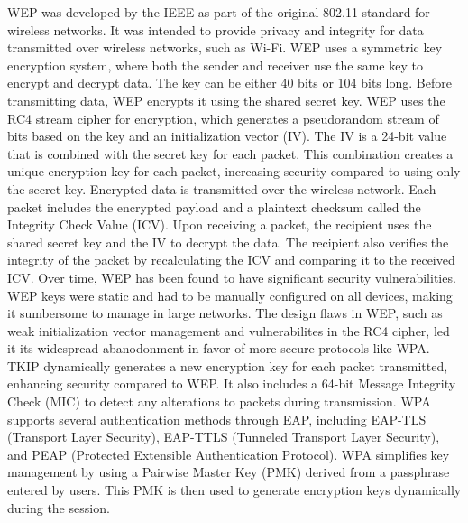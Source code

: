\documentclass{article}
\begin{document}
	WEP was developed by the IEEE as part of the original 802.11 standard for wireless networks. It was intended to provide privacy and integrity for data transmitted over wireless networks, such as Wi-Fi. WEP uses a symmetric key encryption system, where both the sender and receiver use the same key to encrypt and decrypt data. The key can be either 40 bits or 104 bits long. Before transmitting data, WEP encrypts it using the shared secret key. WEP uses the RC4 stream cipher for encryption, which generates a pseudorandom stream of bits based on the key and an initialization vector (IV). The IV is a 24-bit value that is combined with the secret key for each packet. This combination creates a unique encryption key for each packet, increasing security compared to using only the secret key. Encrypted data is transmitted over the wireless network. Each packet includes the encrypted payload and a plaintext checksum called the Integrity Check Value (ICV). Upon receiving a packet, the recipient uses the shared secret key and the IV to decrypt the data. The recipient also verifies the integrity of the packet by recalculating the ICV and comparing it to the received ICV. Over time, WEP has been found to have significant security vulnerabilities. WEP keys were static and had to be manually configured on all devices, making it sumbersome to manage in large networks. The design flaws in WEP, such as weak initialization vector management and vulnerabilites in the RC4 cipher, led it its widespread abanodonment in favor of more secure protocols like WPA.\\

		TKIP dynamically generates a new encryption key for each packet transmitted, enhancing security compared to WEP. It also includes a 64-bit Message Integrity Check (MIC) to detect any alterations to packets during transmission. WPA supports several authentication methods through EAP, including EAP-TLS (Transport Layer Security), EAP-TTLS (Tunneled Transport Layer Security), and PEAP (Protected Extensible Authentication Protocol). WPA simplifies key management by using a Pairwise Master Key (PMK) derived from a passphrase entered by users. This PMK is then used to generate encryption keys dynamically during the session.\\
		
\end{document}
